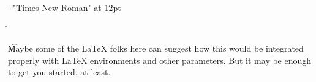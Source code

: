 \font\t="Times New Roman" at 12pt
 \r\n{}
\t{Maybe some of the LaTeX folks here can suggest how this would be integrated properly with LaTeX environments and other parameters. But it may be enough to get you started, at least. }


\bye
